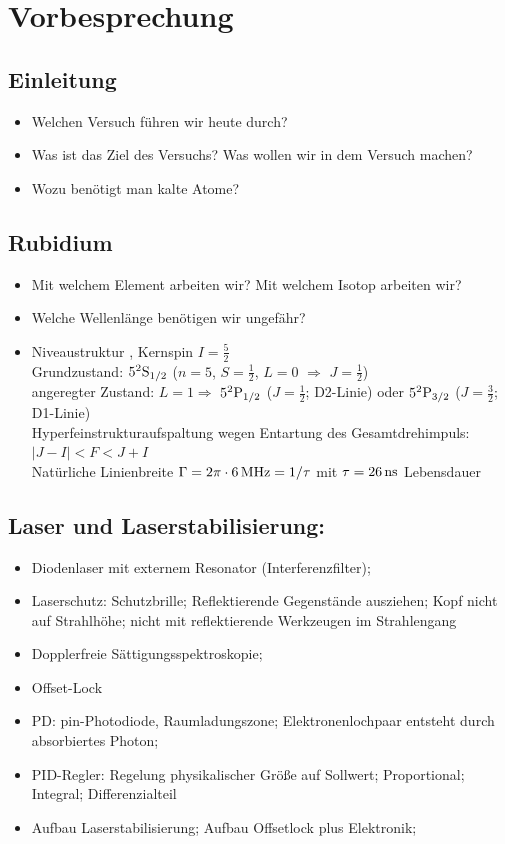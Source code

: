 \documentclass[10pt,a4paper]{extarticle}
\begin{document}
\section*{Vorbesprechung}

\subsection*{Einleitung}
\begin{itemize}
\item Welchen Versuch führen wir heute durch?
\item Was ist das Ziel des Versuchs? Was wollen wir in dem Versuch machen?
\item Wozu benötigt man kalte Atome?
\end{itemize}

\subsection*{Rubidium}
\begin{itemize}
\item Mit welchem Element arbeiten wir? Mit welchem Isotop arbeiten wir? 
\item Welche Wellenlänge benötigen wir ungefähr? 
\item Niveaustruktur , Kernspin $I=\frac{5}{2}$ \\ 
Grundzustand: $5^2\rm{S}_{1/2}$ ($n=5$, $S=\frac{1}{2}$, $L=0$ $\Rightarrow$ $J=\frac{1}{2}$) \\
angeregter Zustand: $L=1 \Rightarrow$ $5^2\rm{P}_{1/2}$ ($J=\frac{1}{2}$; D2-Linie) oder $5^2\rm{P}_{3/2}$ ($J=\frac{3}{2}$; D1-Linie) \\
Hyperfeinstrukturaufspaltung wegen Entartung des Gesamtdrehimpuls: $|J-I|<F<J+I$ \\
Natürliche Linienbreite  $\Gamma=2\pi\cdot\unit[6]{MHz} =1/\tau$ mit  $\tau=\unit[26]{ns}$ Lebensdauer
\end{itemize}

\subsection*{Laser und Laserstabilisierung:}
\begin{itemize}
\item Diodenlaser mit externem Resonator (Interferenzfilter);
\item Laserschutz: Schutzbrille; Reflektierende Gegenstände ausziehen; Kopf nicht auf Strahlhöhe; nicht mit reflektierende Werkzeugen im Strahlengang
\item Dopplerfreie Sättigungsspektroskopie;
\item Offset-Lock
\item PD: pin-Photodiode, Raumladungszone; Elektronenlochpaar entsteht durch absorbiertes Photon;
\item PID-Regler: Regelung physikalischer Größe auf Sollwert; Proportional; Integral; Differenzialteil
\item Aufbau Laserstabilisierung; Aufbau Offsetlock plus Elektronik;
\end{itemize}
\end{document}
